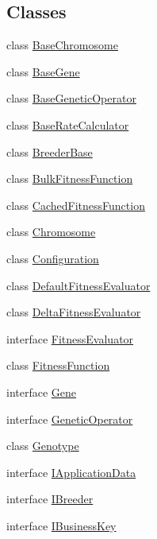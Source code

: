 \subsection*{Classes}
\begin{DoxyCompactItemize}
\item 
class \hyperlink{classorg_1_1jgap_1_1_base_chromosome}{Base\-Chromosome}
\item 
class \hyperlink{classorg_1_1jgap_1_1_base_gene}{Base\-Gene}
\item 
class \hyperlink{classorg_1_1jgap_1_1_base_genetic_operator}{Base\-Genetic\-Operator}
\item 
class \hyperlink{classorg_1_1jgap_1_1_base_rate_calculator}{Base\-Rate\-Calculator}
\item 
class \hyperlink{classorg_1_1jgap_1_1_breeder_base}{Breeder\-Base}
\item 
class \hyperlink{classorg_1_1jgap_1_1_bulk_fitness_function}{Bulk\-Fitness\-Function}
\item 
class \hyperlink{classorg_1_1jgap_1_1_cached_fitness_function}{Cached\-Fitness\-Function}
\item 
class \hyperlink{classorg_1_1jgap_1_1_chromosome}{Chromosome}
\item 
class \hyperlink{classorg_1_1jgap_1_1_configuration}{Configuration}
\item 
class \hyperlink{classorg_1_1jgap_1_1_default_fitness_evaluator}{Default\-Fitness\-Evaluator}
\item 
class \hyperlink{classorg_1_1jgap_1_1_delta_fitness_evaluator}{Delta\-Fitness\-Evaluator}
\item 
interface \hyperlink{interfaceorg_1_1jgap_1_1_fitness_evaluator}{Fitness\-Evaluator}
\item 
class \hyperlink{classorg_1_1jgap_1_1_fitness_function}{Fitness\-Function}
\item 
interface \hyperlink{interfaceorg_1_1jgap_1_1_gene}{Gene}
\item 
interface \hyperlink{interfaceorg_1_1jgap_1_1_genetic_operator}{Genetic\-Operator}
\item 
class \hyperlink{classorg_1_1jgap_1_1_genotype}{Genotype}
\item 
interface \hyperlink{interfaceorg_1_1jgap_1_1_i_application_data}{I\-Application\-Data}
\item 
interface \hyperlink{interfaceorg_1_1jgap_1_1_i_breeder}{I\-Breeder}
\item 
interface \hyperlink{interfaceorg_1_1jgap_1_1_i_business_key}{I\-Business\-Key}
\item 

\end{DoxyCompactItemize}
